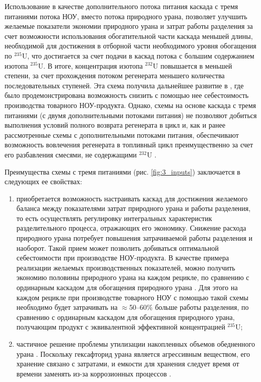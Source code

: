Использование в качестве дополнительного потока питания каскада с тремя питаниями потока НОУ, вместо потока природного урана, позволяет улучшить желаемые показатели экономии природного урана и затрат работы разделения за счет возможности использования обогатительной части каскада меньшей длины, необходимой для достижения в отборной части необходимого уровня обогащения по $^{235}$U, что достигается за счет подачи в каскад потока с большим содержанием изотопа $^{235}$U. В итоге, концентрация изотопа $^{232}$U повышается в меньшей степени, за счет прохождения потоком регенерата меньшего количества последовательных ступеней. Эта схема получила дальнейшее развитие в \cite{smirnovEvaluatingEffectivenessDilution2016}, где было продемонстрирована возможность снизить с помощью нее себестоимость производства товарного НОУ-продукта. Однако, схемы на основе каскада с тремя питаниями (с двумя дополнительными потоками питания) не позволяют добиться выполнения условий полного возврата регенерата в цикл и, как и ранее рассмотренные схемы с дополнительными потоками питания, обеспечивают возможность вовлечения регенерата в топливный цикл преимущественно за счет его разбавления смесями, не содержащими $^{232}$U \cite{smirnovApplyingEnrichmentCapacities2018}.

Преимущества схемы с тремя питаниями (рис. \ref{fig:3_inputs}) заключается в следующих ее свойствах:

\begin{enumerate}
  \item приобретается возможность настраивать каскад для достижения желаемого баланса между показателями затрат природного урана и работы разделения, то есть осуществлять регулировку интегральных характеристик разделительного процесса, отражающих его экономику. Снижение расхода природного урана потребует повышения затрачиваемой работы разделения и наоборот. Такой прием может позволить добиваться оптимальной себестоимости при производстве НОУ-продукта. В качестве примера реализации желаемых производственных показателей, можно получить экономию половины природного урана на каждом рецикле, по сравнению с ординарным каскадом для обогащения природного урана   \cite{smirnovApplyingEnrichmentCapacities2018}. Для этого на каждом рецикле при производстве товарного НОУ с помощью такой схемы необходимо будет затрачивать на $\approx$50--60\% больше работы разделения, по сравнению с ординарным каскадом для обогащения природного урана, получающим продукт с эквивалентной эффективной концентрацией $^{235}$U;
  \item частичное решение проблемы утилизации накопленных объемов обедненного урана \cite{smirnovEnrichmentRegeneratedUranium2014}. Поскольку гексафторид урана является агрессивным веществом, его хранение связано с затратами, и емкости для хранения следует время от времени заменять из-за коррозионных процессов \cite{fitchOPTIONSDISPOSALREAPPLICATION2009, oecdManagementDepletedUranium2001}.
\end{enumerate}

